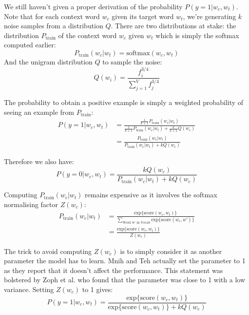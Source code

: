 We still haven't given a proper derivation of the probability $P(y=1| w_c, w_t)$. Note that for each context word $w_c$ given its target word $w_t$, we're generating $k$ noise samples from a distribution $Q$. There are two distributions at stake: the distribution $P_{\text{train}}$ of the context word $w_c$ given $w_t$ which is simply the softmax computed earlier:
\begin{equation}
    P_{\text{train}}(w_c|w_t) = \text{softmax}(w_c, w_t)
\end{equation}
And the unigram distribution $Q$ to sample the noise:
\begin{equation}
    Q(w_i) = \frac{f_i^{3/4}}{\sum_{j=1}^V f_j^{3/4}}
\end{equation}

The probability to obtain a positive example is simply a weighted probability of seeing an example from $P_{\text{train}}$:
\begin{align}
    P(y=1| w_c, w_t) &= \frac{\frac{1}{k+1}P_{\text{train}}(w_c|w_t)}{\frac{1}{k+1}P_{\text{train}}(w_c|w_t) + \frac{k}{k+1}Q(w_c)}\nonumber \\
     &= \frac{P_{\text{train}}(w_c|w_t)}{P_{\text{train}}(w_c|w_t) + kQ(w_c)}
\end{align}

Therefore we also have:
\begin{equation}
    P(y=0| w_c, w_t) = \frac{kQ(w_c)}{P_{\text{train}}(w_c|w_t) + kQ(w_c)}
\end{equation}

Computing $P_{\text{train}}(w_c|w_t)$ remains expensive as it involves the softmax normalising factor $Z(w_c)$:
\begin{align}
    P_{\text{train}}(w_c|w_t) &= \frac{\text{exp}\{\text{score}(w_c, w_t)\}}{\sum_{\text{Word w' in Vocab}}\text{exp}\{\text{score}(w_c, w')\}} \nonumber \\
     &= \frac{\text{exp}\{\text{score}(w_c, w_t)\}}{Z(w_c)}
\end{align}

The trick to avoid computing $Z(w_c)$ is to simply consider it as another parameter the model has to learn. Mnih and Teh \cite{nce} actually set the parameter to 1 as they report that it doesn't affect the performance. This statement was bolstered by Zoph et al. \cite{nce2} who found that the parameter was close to 1 with a low variance. Setting $Z(w_c)$ to 1 gives:
\begin{equation}
    P(y=1| w_c, w_t) = \frac{\text{exp}\{\text{score}(w_c, w_t)\}}{\text{exp}\{\text{score}(w_c, w_t)\} + kQ(w_c)}
\end{equation}

